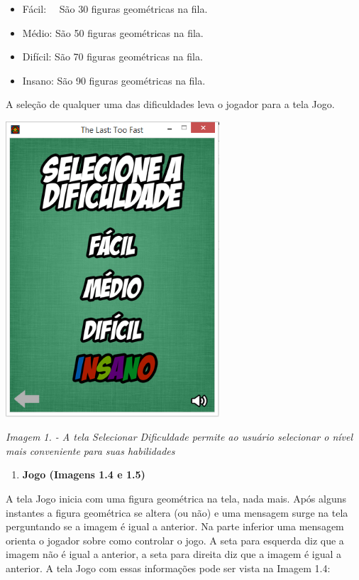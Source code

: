 \documentclass[a4paper]{article}
\newcommand\liststyleWWNumiii{%
\renewcommand\theenumi{\arabic{enumi}}
\renewcommand\theenumii{\alph{enumii}}
\renewcommand\theenumiii{\roman{enumiii}}
\renewcommand\theenumiv{\arabic{enumiv}}
\renewcommand\labelenumi{\theenumi.}
\renewcommand\labelenumii{\theenumii.}
\renewcommand\labelenumiii{\theenumiii.}
\renewcommand\labelenumiv{\theenumiv.}
}
\newcommand\liststyleWWNumiv{%
\renewcommand\labelitemi{[F0B7?]}
\renewcommand\labelitemii{o}
\renewcommand\labelitemiii{[F0A7?]}
\renewcommand\labelitemiv{[F0B7?]}
}
\newcounter{Imagem2}
\renewcommand\theImagem2{\arabic{Imagem2}}
\newcounter{Imagem1}
\renewcommand\theImagem1{\arabic{Imagem1}}
\begin{document}
\liststyleWWNumiv
\begin{itemize}
\item Fácil: \ \  São 30 figuras geométricas na fila.
\item Médio: São 50 figuras geométricas na fila.
\item Difícil: São 70 figuras geométricas na fila.
\item Insano: São 90 figuras geométricas na fila.
\end{itemize}
A seleção de qualquer uma das dificuldades leva o jogador para a tela
Jogo.


\bigskip


\bigskip

{\centering 
\includegraphics[width=3.1402in,height=4.3307in]{T1-img4.png} \par}

{\centering\itshape\color[rgb]{0.26666668,0.32941177,0.41568628}
Imagem 1. \stepcounter{Imagem1}{\theImagem1} - A tela
{\textquotedbl}Selecionar Dificuldade{\textquotedbl} permite ao usuário
selecionar o nível mais conveniente para suas habilidades
\par}


\bigskip

\liststyleWWNumiii
\begin{enumerate}
\item \textbf{Jogo (Imagens 1.4 e 1.5)}
\end{enumerate}
A tela Jogo inicia com uma figura geométrica na tela, nada mais. Após
alguns instantes a figura geométrica se altera (ou não) e uma mensagem
surge na tela perguntando se a imagem é igual a anterior. Na parte
inferior uma mensagem orienta o jogador sobre como controlar o jogo. A
seta para esquerda diz que a imagem não é igual a anterior, a seta para
direita diz que a imagem é igual a anterior. A tela Jogo com essas
informações pode ser vista na Imagem 1.4:
\end{document}
